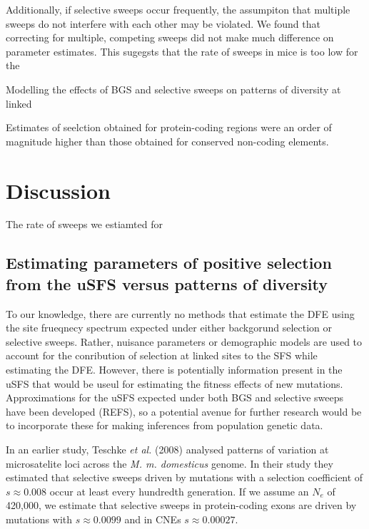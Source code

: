 \documentclass[11pt]{article}
\begin{document}
	Additionally, if selective sweeps occur frequently, the assumpiton that multiple sweeps do not interfere with each other may be violated. We found that correcting for multiple, competing sweeps did not make much difference on parameter estimates. This sugegsts that the rate of sweeps in mice is too low for the 

Modelling the effects of BGS and selective sweeps on patterns of diversity at linked 


Estimates of seelction obtained for protein-coding regions were an order of magnitude higher than those obtained for conserved non-coding elements. 




\section*{Discussion}

The rate of sweeps we estiamted for 

\subsection*{Estimating parameters of positive selection from the uSFS versus patterns of diversity}

To our knowledge, there are currently no methods that estimate the DFE using the site frueqnecy spectrum expected under either backgorund selection or selective sweeps. Rather, nuisance parameters or demographic models are used to account for the conribution of selection at linked sites to the SFS while estimating the DFE. However, there is potentially information present in the uSFS that would be useul for estimating the fitness effects of new mutations. Approximations for the uSFS expected under both BGS and selective sweeps have been developed (REFS), so a potential avenue for further research would be to incorporate these for making inferences from population genetic data.

In an earlier study, Teschke \textit{et al.} (2008) analysed patterns of variation at microsatelite loci across the \textit{M. m. domesticus} genome. In their study they estimated that selective sweeps driven by mutations with a selection coefficient of $s \approx 0.008$ occur at least every hundredth generation. If we assume an $N_e$ of 420,000, we estimate that selective sweeps in protein-coding exons are driven by mutations with $s \approx 0.0099$ and in CNEs $s \approx 0.00027$. 
\end{document}

